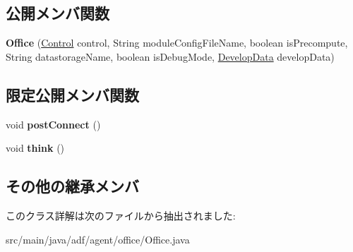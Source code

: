 \subsection*{公開メンバ関数}
\begin{DoxyCompactItemize}
\item 
\hypertarget{classadf_1_1agent_1_1office_1_1Office_a268ea2e1ac55d33f643beb974dba8071}{}\label{classadf_1_1agent_1_1office_1_1Office_a268ea2e1ac55d33f643beb974dba8071} 
{\bfseries Office} (\hyperlink{classadf_1_1component_1_1control_1_1Control}{Control} control, String module\+Config\+File\+Name, boolean is\+Precompute, String datastorage\+Name, boolean is\+Debug\+Mode, \hyperlink{classadf_1_1agent_1_1develop_1_1DevelopData}{Develop\+Data} develop\+Data)
\end{DoxyCompactItemize}
\subsection*{限定公開メンバ関数}
\begin{DoxyCompactItemize}
\item 
\hypertarget{classadf_1_1agent_1_1office_1_1Office_a501ed865cdd1e754940ba5dfc10484f3}{}\label{classadf_1_1agent_1_1office_1_1Office_a501ed865cdd1e754940ba5dfc10484f3} 
void {\bfseries post\+Connect} ()
\item 
\hypertarget{classadf_1_1agent_1_1office_1_1Office_aa101ca935dd000ff85b1f31733e9bd9e}{}\label{classadf_1_1agent_1_1office_1_1Office_aa101ca935dd000ff85b1f31733e9bd9e} 
void {\bfseries think} ()
\end{DoxyCompactItemize}
\subsection*{その他の継承メンバ}


このクラス詳解は次のファイルから抽出されました\+:\begin{DoxyCompactItemize}
\item 
src/main/java/adf/agent/office/Office.\+java\end{DoxyCompactItemize}
